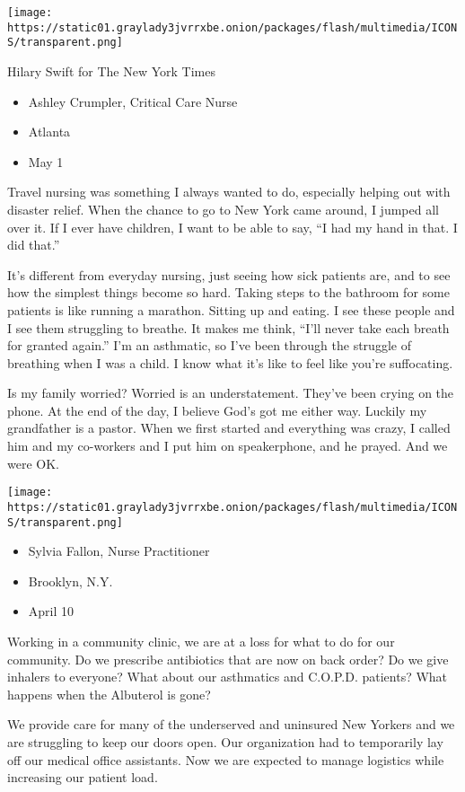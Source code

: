 \texttt{[image: https://static01.graylady3jvrrxbe.onion/packages/flash/multimedia/ICONS/transparent.png]}

Hilary Swift for The New York Times

\begin{itemize}
\tightlist
\item
  Ashley Crumpler, Critical Care Nurse
\item
  Atlanta
\item
  May 1
\end{itemize}

Travel nursing was something I always wanted to do, especially helping
out with disaster relief. When the chance to go to New York came around,
I jumped all over it. If I ever have children, I want to be able to say,
``I had my hand in that. I did that.''

It's different from everyday nursing, just seeing how sick patients are,
and to see how the simplest things become so hard. Taking steps to the
bathroom for some patients is like running a marathon. Sitting up and
eating. I see these people and I see them struggling to breathe. It
makes me think, ``I'll never take each breath for granted again.'' I'm
an asthmatic, so I've been through the struggle of breathing when I was
a child. I know what it's like to feel like you're suffocating.

Is my family worried? Worried is an understatement. They've been crying
on the phone. At the end of the day, I believe God's got me either way.
Luckily my grandfather is a pastor. When we first started and everything
was crazy, I called him and my co-workers and I put him on speakerphone,
and he prayed. And we were OK.

\texttt{[image: https://static01.graylady3jvrrxbe.onion/packages/flash/multimedia/ICONS/transparent.png]}

\begin{itemize}
\tightlist
\item
  Sylvia Fallon, Nurse Practitioner
\item
  Brooklyn, N.Y.
\item
  April 10
\end{itemize}

Working in a community clinic, we are at a loss for what to do for our
community. Do we prescribe antibiotics that are now on back order? Do we
give inhalers to everyone? What about our asthmatics and C.O.P.D.
patients? What happens when the Albuterol is gone?

We provide care for many of the underserved and uninsured New Yorkers
and we are struggling to keep our doors open. Our organization had to
temporarily lay off our medical office assistants. Now we are expected
to manage logistics while increasing our patient load.

